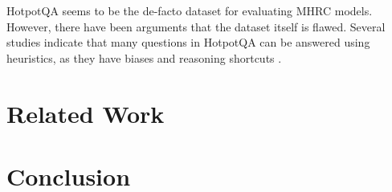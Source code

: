\documentclass[sigplan,screen]{acmart}
\begin{document}
HotpotQA seems to be the de-facto dataset for evaluating MHRC models. However, there have been arguments that the dataset itself is flawed. 
Several studies \cite{RN176} \cite{RN175} \cite{RN154} \cite{RN150} indicate that many questions in HotpotQA can be answered using heuristics, 
as they have biases and reasoning shortcuts \cite{RN177}.



\section{Related Work}

\section{Conclusion}



\end{document}
